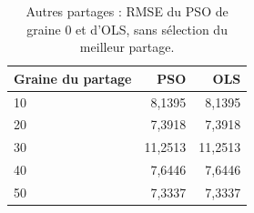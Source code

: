 \begin{table}[t]\centering\small
\caption{Autres partages : RMSE du PSO de graine 0 et d'OLS, sans sélection du meilleur partage.}
\label{tab:partages}
\begin{tabular}{lrr}\toprule
Graine du partage & PSO & OLS\\\midrule
10 & 8,1395 & 8,1395\\
20 & 7,3918 & 7,3918\\
30 & 11,2513 & 11,2513\\
40 & 7,6446 & 7,6446\\
50 & 7,3337 & 7,3337\\
\bottomrule
\end{tabular}
\end{table}
